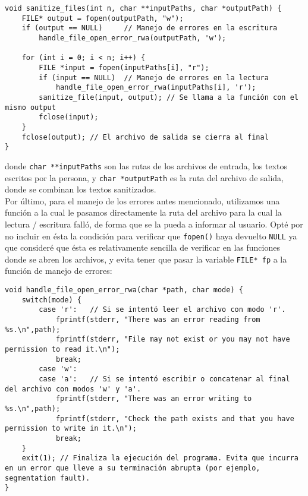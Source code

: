 \documentclass[a4paper]{article}
\begin{document}
\begin{verbatim}
void sanitize_files(int n, char **inputPaths, char *outputPath) {
    FILE* output = fopen(outputPath, "w");
    if (output == NULL)     // Manejo de errores en la escritura
        handle_file_open_error_rwa(outputPath, 'w');

    for (int i = 0; i < n; i++) {
        FILE *input = fopen(inputPaths[i], "r");
        if (input == NULL)  // Manejo de errores en la lectura
            handle_file_open_error_rwa(inputPaths[i], 'r');
        sanitize_file(input, output); // Se llama a la función con el mismo output
        fclose(input);
    }
    fclose(output); // El archivo de salida se cierra al final
}
\end{verbatim}

\noindent donde \texttt{char **inputPaths} son las rutas de los archivos de entrada, los textos escritos por la persona, y \texttt{char *outputPath} es la ruta del archivo de salida, donde se combinan los textos sanitizados. \\

Por último, para el manejo de los errores antes mencionado, utilizamos una función a la cual le pasamos directamente la ruta del archivo para la cual la lectura / escritura falló, de forma que se la pueda a informar al usuario. Opté por no incluir en ésta la condición para verificar que \texttt{fopen()} haya devuelto \texttt{NULL} ya que consideré que ésta es relativamente sencilla de verificar en las funciones donde se abren los archivos, y evita tener que pasar la variable \texttt{FILE* fp} a la función de manejo de errores:

\begin{verbatim}
void handle_file_open_error_rwa(char *path, char mode) {
    switch(mode) {
        case 'r':   // Si se intentó leer el archivo con modo 'r'.
            fprintf(stderr, "There was an error reading from %s.\n",path);
            fprintf(stderr, "File may not exist or you may not have permission to read it.\n");
            break;
        case 'w':
        case 'a':   // Si se intentó escribir o concatenar al final del archivo con modos 'w' y 'a'.
            fprintf(stderr, "There was an error writing to %s.\n",path);
            fprintf(stderr, "Check the path exists and that you have permission to write in it.\n");
            break;
    }
    exit(1); // Finaliza la ejecución del programa. Evita que incurra en un error que lleve a su terminación abrupta (por ejemplo, segmentation fault).
}
\end{verbatim}
\end{document}
